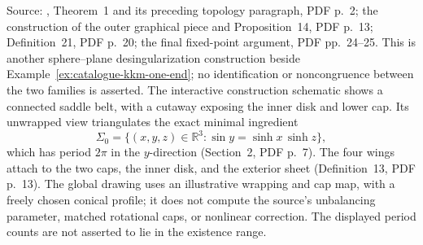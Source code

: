 \begin{example}
Source: \cite{CatNguyenShrinker2014}, Theorem~1 and its preceding topology paragraph, PDF p.~2; the construction of the outer graphical piece and Proposition~14, PDF p.~13; Definition~21, PDF p.~20; the final fixed-point argument, PDF pp.~24--25. This is another sphere--plane desingularization construction beside Example~\ref{ex:catalogue-kkm-one-end}; no identification or noncongruence between the two families is asserted. The interactive construction schematic shows a connected saddle belt, with a cutaway exposing the inner disk and lower cap. Its unwrapped view triangulates the exact minimal ingredient
\[
 \Sigma_0=\{(x,y,z)\in\mathbb R^3:\sin y=\sinh x\,\sinh z\},
\]
which has period $2\pi$ in the $y$-direction (Section~2, PDF p.~7). The four wings attach to the two caps, the inner disk, and the exterior sheet (Definition~13, PDF p.~13). The global drawing uses an illustrative wrapping and cap map, with a freely chosen conical profile; it does not compute the source's unbalancing parameter, matched rotational caps, or nonlinear correction. The displayed period counts are not asserted to lie in the existence range.
\end{example}

